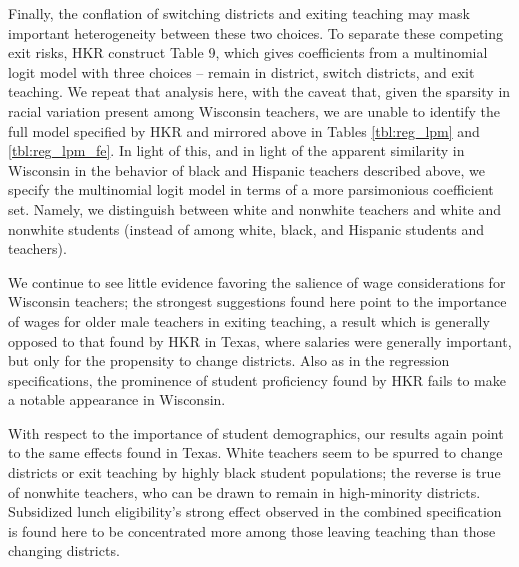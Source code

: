 Finally, the conflation of switching districts and exiting teaching may
mask important heterogeneity between these two choices. To separate
these competing exit risks, HKR construct Table 9, which gives
coefficients from a multinomial logit model with three choices -- remain
in district, switch districts, and exit teaching. We repeat that
analysis here, with the caveat that, given the sparsity in racial
variation present among Wisconsin teachers, we are unable to identify
the full model specified by HKR and mirrored above in Tables
\ref{tbl:reg_lpm} and \ref{tbl:reg_lpm_fe}. In light of this, and in
light of the apparent similarity in Wisconsin in the behavior of black
and Hispanic teachers described above, we specify the multinomial logit
model in terms of a more parsimonious coefficient set. Namely, we
distinguish between white and nonwhite teachers and white and nonwhite
students (instead of among white, black, and Hispanic students and
teachers).

We continue to see little evidence favoring the salience of wage
considerations for Wisconsin teachers; the strongest suggestions found
here point to the importance of wages for older male teachers in exiting
teaching, a result which is generally opposed to that found by HKR in
Texas, where salaries were generally important, but only for the
propensity to change districts. Also as in the regression
specifications, the prominence of student proficiency found by HKR fails
to make a notable appearance in Wisconsin.

With respect to the importance of student demographics, our results
again point to the same effects found in Texas. White teachers seem to
be spurred to change districts or exit teaching by highly black student
populations; the reverse is true of nonwhite teachers, who can be drawn
to remain in high-minority districts. Subsidized lunch eligibility's
strong effect observed in the combined specification is found here to be
concentrated more among those leaving teaching than those changing
districts.

